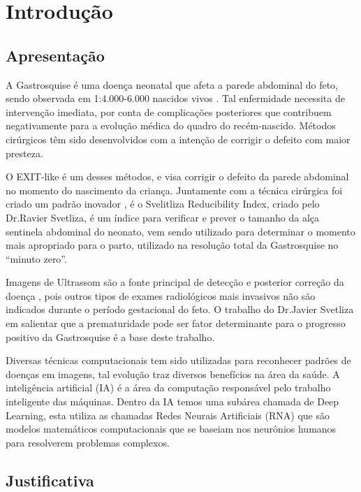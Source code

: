 \chapter{Introdução}



\section{Apresentação}

A Gastrosquise é uma doença neonatal que afeta a parede abdominal do feto, sendo observada em 1:4.000-6.000 nascidos vivos . Tal enfermidade necessita de intervenção imediata, por conta de complicações posteriores que contribuem negativamente para a evolução médica do quadro do recém-nascido. Métodos cirúrgicos têm sido desenvolvidos com a intenção de corrigir o defeito com maior presteza. 


O EXIT-like é um desses métodos, e visa corrigir o defeito da parede abdominal no momento do nascimento da criança. Juntamente com a técnica cirúrgica foi criado um padrão inovador , é o Svelitliza Reducibility Index, criado pelo Dr.Ravier Svetliza, é um índice para verificar e prever o tamanho da alça sentinela abdominal do neonato, vem sendo utilizado para determinar o momento mais apropriado para o parto, utilizado na resolução total da Gastrosquise no “minuto zero”. 


Imagens de Ultrassom são a fonte principal de detecção e posterior correção da doença , pois outros tipos de exames radiológicos mais invasivos não são indicados durante o período gestacional do feto. O trabalho do Dr.Javier Svetliza em  salientar que a prematuridade pode ser fator determinante para o progresso positivo da Gastrosquise é a base deste trabalho. 


Diversas técnicas computacionais tem sido utilizadas para reconhecer padrões de doenças em imagens, tal evolução traz diversos benefícios na área da saúde. A inteligência artificial (IA) é a área da computação responsável pelo trabalho inteligente das máquinas. Dentro da IA temos uma subárea chamada de Deep Learning, esta utiliza as chamadas Redes Neurais Artificiais (RNA) que são modelos matemáticos computacionais que se baseiam nos neurônios humanos para resolverem problemas complexos.




\newpage

\section{Justificativa}

